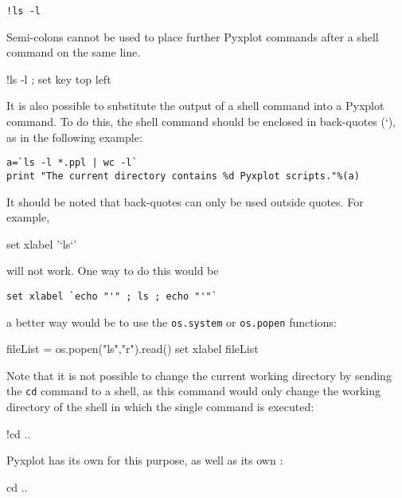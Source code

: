 \begin{verbatim}
!ls -l
\end{verbatim}

\noindent Semi-colons cannot be used to place further Pyxplot commands after a
shell command on the same line.

\begin{dontdo}
!ls -l ; set key top left
\end{dontdo}

It is also possible to substitute the output of a shell command into a Pyxplot
command. To do this, the shell command should be enclosed in back-quotes (`),
as in the following example:

\begin{verbatim}
a=`ls -l *.ppl | wc -l`
print "The current directory contains %d Pyxplot scripts."%(a)
\end{verbatim}

It should be noted that back-quotes can only be used outside quotes. For
example,

\begin{dontdo}
set xlabel '`ls`'
\end{dontdo}

\noindent will not work. One way to do this would be

\begin{verbatim}
set xlabel `echo "'" ; ls ; echo "'"`
\end{verbatim}

\noindent a better way would be to use the {\tt os.system} or {\tt os.popen} functions:

\begin{dodo}
fileList = os.popen("ls","r").read()\newline
set xlabel fileList
\end{dodo}

Note that it is not possible to change the current working directory by sending
the {\tt cd} command to a shell, as this command would only change the working
directory of the shell in which the single command is executed:

\begin{dontdo}
!cd ..
\end{dontdo}

\noindent Pyxplot has its own  for this purpose, as well as its own
:

\begin{dodo}
cd ..
\end{dodo}

